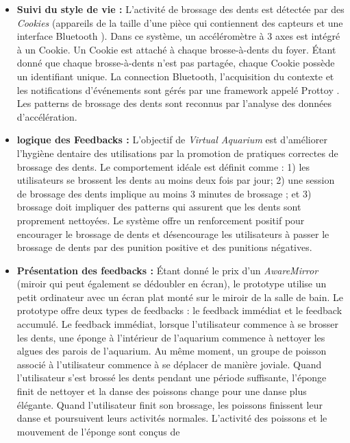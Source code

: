 \documentclass[10pt,a5paper,twoside]{article}
\begin{document}
\begin{itemize}
\itemsep1pt\parskip0pt
\item
  \textbf{Suivi du style de vie :} L'activité de brossage des dents est
  détectée par des \emph{Cookies} (appareils de la taille d'une pièce
  qui contiennent des capteurs et une interface Bluetooth
  \citep{kimura2006cookieflavors}). Dans ce système, un accéléromètre à
  3 axes est intégré à un Cookie. Un Cookie est attaché à chaque
  brosse-à-dents du foyer. Étant donné que chaque brosse-à-dents n'est
  pas partagée, chaque Cookie possède un identifiant unique. La
  connection Bluetooth, l'acquisition du contexte et les notifications
  d'événements sont gérés par une framework appelé Prottoy
  \citep{kawsar2005prottoy}. Les patterns de brossage des dents sont
  reconnus par l'analyse des données d'accélération.
\item
  \textbf{logique des Feedbacks :} L'objectif de \emph{Virtual Aquarium}
  est d'améliorer l'hygiène dentaire des utilisations par la promotion
  de pratiques correctes de brossage des dents. Le comportement idéale
  est définit comme : 1) les utilisateurs se brossent les dents au moins
  deux fois par jour; 2) une session de brossage des dents implique au
  moins 3 minutes de brossage ; et 3) brossage doit impliquer des
  patterns qui assurent que les dents sont proprement nettoyées. Le
  système offre un renforcement positif pour encourager le brossage de
  dents et désencourage les utilisateurs à passer le brossage de dents
  par des punition positive et des punitions négatives.
\item
  \textbf{Présentation des feedbacks :} Étant donné le prix d'un
  \emph{AwareMirror} (miroir qui peut également se dédoubler en écran),
  le prototype utilise un petit ordinateur avec un écran plat monté sur
  le miroir de la salle de bain. Le prototype offre deux types de
  feedbacks : le feedback immédiat et le feedback accumulé. Le feedback
  immédiat, lorsque l'utilisateur commence à se brosser les dents, une
  éponge à l'intérieur de l'aquarium commence à nettoyer les algues des
  parois de l'aquarium. Au même moment, un groupe de poisson associé à
  l'utilisateur commence à se déplacer de manière joviale. Quand
  l'utilisateur s'est brossé les dents pendant une période suffisante,
  l'éponge finit de nettoyer et la danse des poissons change pour une
  danse plus élégante. Quand l'utilisateur finit son brossage, les
  poissons finissent leur danse et poursuivent leurs activités normales.
  L'activité des poissons et le mouvement de l'éponge sont conçus de

\end{itemize}
\end{document}
